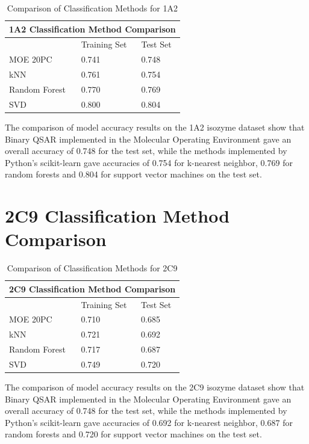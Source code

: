 \begin{table}[H]
\begin{tabular}{|l|l|l|}
\hline
\multicolumn{3}{|c|}{1A2 Classification Method Comparison} \\ \hline
          & Training Set & Test Set \\ \hline
MOE 20PC  & 0.741        & 0.748    \\ \hline
kNN       & 0.761        & 0.754    \\ \hline
Random Forest & 0.770    & 0.769    \\ \hline
SVD       & 0.800        & 0.804    \\ \hline
\end{tabular}
\caption{Comparison of Classification Methods for 1A2}
\end{table}

The comparison of model accuracy results on the 1A2 isozyme dataset show that Binary QSAR implemented in the Molecular Operating Environment gave an overall accuracy of 0.748 for the test set, while the methods implemented by Python's scikit-learn gave accuracies of 0.754 for k-nearest neighbor, 0.769 for random forests and 0.804 for support vector machines on the test set.

\section{2C9 Classification Method Comparison}

\begin{table}[H]
\begin{tabular}{|l|l|l|}
\hline
\multicolumn{3}{|c|}{2C9 Classification Method Comparison} \\ \hline
          & Training Set & Test Set \\ \hline
MOE 20PC  & 0.710        & 0.685    \\ \hline
kNN       & 0.721        & 0.692    \\ \hline
Random Forest & 0.717    & 0.687    \\ \hline
SVD       & 0.749        & 0.720    \\ \hline
\end{tabular}
\caption{Comparison of Classification Methods for 2C9}
\end{table}

The comparison of model accuracy results on the 2C9 isozyme dataset show that Binary QSAR implemented in the Molecular Operating Environment gave an overall accuracy of 0.748 for the test set, while the methods implemented by Python's scikit-learn gave accuracies of 0.692 for k-nearest neighbor, 0.687 for random forests and 0.720 for support vector machines on the test set.


